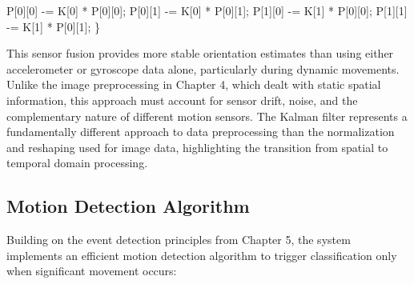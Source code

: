 \documentclass[
  9pt,
  letterpaper,
  abstract,
  titlepage]{scrbook}
\newenvironment{Shaded}{\begin{snugshade}}{\end{snugshade}}
\newcommand{\DecValTok}[1]{\textcolor[rgb]{0.68,0.00,0.00}{#1}}
\newcommand{\NormalTok}[1]{\textcolor[rgb]{0.00,0.23,0.31}{#1}}
\newcommand{\OperatorTok}[1]{\textcolor[rgb]{0.37,0.37,0.37}{#1}}
\begin{document}
\begin{Shaded}
\begin{Highlighting}[]
\NormalTok{  P}\OperatorTok{[}\DecValTok{0}\OperatorTok{][}\DecValTok{0}\OperatorTok{]} \OperatorTok{{-}=}\NormalTok{ K}\OperatorTok{[}\DecValTok{0}\OperatorTok{]} \OperatorTok{*}\NormalTok{ P}\OperatorTok{[}\DecValTok{0}\OperatorTok{][}\DecValTok{0}\OperatorTok{];}
\NormalTok{  P}\OperatorTok{[}\DecValTok{0}\OperatorTok{][}\DecValTok{1}\OperatorTok{]} \OperatorTok{{-}=}\NormalTok{ K}\OperatorTok{[}\DecValTok{0}\OperatorTok{]} \OperatorTok{*}\NormalTok{ P}\OperatorTok{[}\DecValTok{0}\OperatorTok{][}\DecValTok{1}\OperatorTok{];}
\NormalTok{  P}\OperatorTok{[}\DecValTok{1}\OperatorTok{][}\DecValTok{0}\OperatorTok{]} \OperatorTok{{-}=}\NormalTok{ K}\OperatorTok{[}\DecValTok{1}\OperatorTok{]} \OperatorTok{*}\NormalTok{ P}\OperatorTok{[}\DecValTok{0}\OperatorTok{][}\DecValTok{0}\OperatorTok{];}
\NormalTok{  P}\OperatorTok{[}\DecValTok{1}\OperatorTok{][}\DecValTok{1}\OperatorTok{]} \OperatorTok{{-}=}\NormalTok{ K}\OperatorTok{[}\DecValTok{1}\OperatorTok{]} \OperatorTok{*}\NormalTok{ P}\OperatorTok{[}\DecValTok{0}\OperatorTok{][}\DecValTok{1}\OperatorTok{];}
\OperatorTok{\}}
\end{Highlighting}
\end{Shaded}

This sensor fusion provides more stable orientation estimates than using
either accelerometer or gyroscope data alone, particularly during
dynamic movements. Unlike the image preprocessing in Chapter 4, which
dealt with static spatial information, this approach must account for
sensor drift, noise, and the complementary nature of different motion
sensors. The Kalman filter represents a fundamentally different approach
to data preprocessing than the normalization and reshaping used for
image data, highlighting the transition from spatial to temporal domain
processing.

\subsection{Motion Detection
Algorithm}\label{motion-detection-algorithm}

Building on the event detection principles from Chapter 5, the system
implements an efficient motion detection algorithm to trigger
classification only when significant movement occurs:
\end{document}
